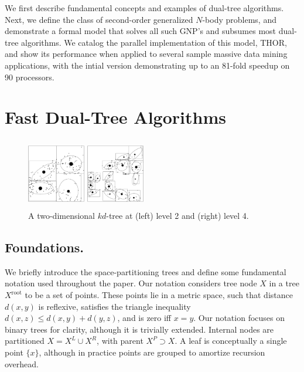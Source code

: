 \documentclass[twoside,leqno,twocolumn]{article}
\newcommand{\union}{\cup}
\newcommand{\mysub}[1]{\subsection{#1.}}
\newcommand{\kdroot}[1]{#1^{\text{root}}}
\newcommand{\kdleft}[1]{#1^{\!L}}
\newcommand{\kdright}[1]{#1^{\!R}}
\newcommand{\kdparent}[1]{#1^{\!P}}
\newcommand{\dist}[2]{d(#1,#2)}
\begin{document}
We first describe fundamental concepts and examples of dual-tree algorithms.
Next, we define the class of second-order generalized $N$-body problems, and demonstrate a formal model that solves all such GNP's and subsumes most dual-tree algorithms.
We catalog the parallel implementation of this model, THOR, and show its performance when applied to several sample massive data mining applications, with the intial version demonstrating up to an 81-fold speedup on 90 processors.

\section{Fast Dual-Tree Algorithms}

\begin{figure}[t]
  \centering
  \begin{minipage}{3.2in}
    \begin{minipage}{1.05in}
      \includegraphics[width=1.0in,height=1.2in]{kdtree-level2.ps}
    \end{minipage}
    \begin{minipage}{1.05in}
      \includegraphics[width=1.0in,height=1.2in]{kdtree-level4.ps}
    \end{minipage}
    \begin{minipage}{1.0in}
      \footnotesize{\caption{\label{fig:kdtree} A two-dimensional
          $kd$-tree at (left) level 2 and (right) level 4.}}
    \end{minipage}
  \end{minipage}
\end{figure}


\mysub{Foundations}
We briefly introduce the space-partitioning trees and define some fundamental notation used throughout the paper.
Our notation considers tree node $X$ in a tree $\kdroot{X}$ to be a set of points.
These points lie in a metric space, such that distance $\dist{x}{y}$ is reflexive, satisfies the triangle inequality $\dist{x}{z} \leq \dist{x}{y} + \dist{y}{z}$, and is zero iff $x = y$.
Our notation focuses on binary trees for clarity, although it is trivially extended.
Internal nodes are partitioned $X = \kdleft{X} \union \kdright{X}$, with parent $\kdparent{X} \supset X$.
A leaf is conceptually a single point $\{x\}$, although in practice points are grouped to amortize recursion overhead.
\end{document}
